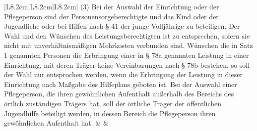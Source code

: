 \documentclass[10pt,a4paper,landscape]{article}
\begin{document}
\begin{longtable}{|L{8.2cm}|L{8.2cm}|L{8.2cm}|}
\textcolor{diffred}{(3) Bei der Auswahl der Einrichtung oder  \newline der Pflegeperson sind der  \newline Personensorgeberechtigte und das Kind  \newline oder der Jugendliche oder bei Hilfen nach  \newline \S{} 41 der junge Volljährige zu beteiligen.  \newline Der Wahl und den Wünschen des  \newline Leistungsberechtigten ist zu entsprechen,  \newline sofern sie nicht mit unverhältnismäßigen  \newline Mehrkosten verbunden sind. Wünschen die  \newline in Satz 1 genannten Personen die  \newline Erbringung einer in \S{} 78a genannten  \newline Leistung in einer Einrichtung, mit deren  \newline Träger keine Vereinbarungen nach \S{} 78b  \newline bestehen, so soll der Wahl nur entsprochen  \newline werden, wenn die Erbringung der Leistung  \newline in dieser Einrichtung nach Maßgabe des  \newline Hilfeplans geboten ist. Bei der Auswahl  \newline einer Pflegeperson, die ihren gewöhnlichen  \newline Aufenthalt außerhalb des Bereichs des  \newline örtlich zuständigen Trägers hat, soll der  \newline örtliche Träger der öffentlichen Jugendhilfe  \newline beteiligt werden, in dessen Bereich die  \newline Pflegeperson ihren gewöhnlichen  \newline Aufenthalt hat. } &  &  \\
\hhline{|---|}

\end{longtable}
\end{document}
